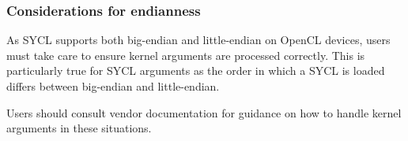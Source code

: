 \subsubsection{Considerations for endianness}

As SYCL supports both big-endian and little-endian on OpenCL devices, users must
take care to ensure kernel arguments are processed correctly. This is
particularly true for SYCL  arguments as the order in which a
SYCL  is loaded differs between big-endian and little-endian.

Users should consult vendor documentation for guidance on how to handle kernel
arguments in these situations.
